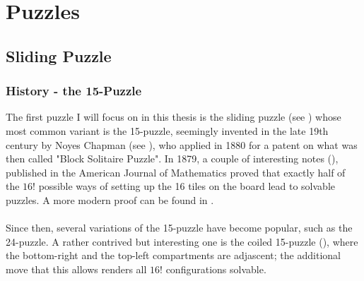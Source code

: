 
\chapter{Puzzles} %

\label{sec:Puzzles} %

\section{Sliding Puzzle}


\subsection{History - the 15-Puzzle}


The first puzzle I will focus on in this thesis is the sliding puzzle (see \cite{SlidingPuzzleWiki}) whose most common variant is the 15-puzzle, seemingly invented in the late 19th century by Noyes Chapman (see \cite{SlidingPuzzleWolfram}), who applied in 1880 for a patent on what was then called "Block Solitaire Puzzle". In 1879, a couple of interesting notes (\cite{Johnson1879}), published in the American Journal of Mathematics proved that exactly half of the $16!$ possible ways of setting up the 16 tiles on the board lead to solvable puzzles. A more modern proof can be found in \cite{Archer1999}.
\\
\\
Since then, several variations of the 15-puzzle have become popular, such as the 24-puzzle. A rather contrived but interesting one is the coiled 15-puzzle (\cite{Coiled15Puzzle}), where the bottom-right and the top-left compartments are adjascent; the additional move that this allows renders all $16!$ configurations solvable. 



